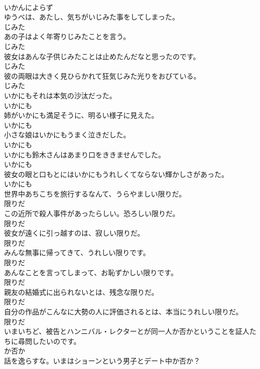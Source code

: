 \documentclass[8pt]{extreport}
\begin{document}
\begin{CJK}{UTF8}{min}
\\	いかんによらず
\\	ゆうべは、あたし、気ちがいじみた事をしてしまった。	
\\	じみた
\\	あの子はよく年寄りじみたことを言う。	
\\	じみた
\\	彼女はあんな子供じみたことは止めたんだなと思ったのです。	
\\	じみた
\\	彼の両眼は大きく見ひらかれて狂気じみた光りをおびている。	
\\	じみた
\\	いかにもそれは本気の沙汰だった。	
\\	いかにも
\\	姉がいかにも満足そうに、明るい様子に見えた。	
\\	いかにも
\\	小さな娘はいかにもうまく泣きだした。	
\\	いかにも
\\	いかにも鈴木さんはあまり口をききませんでした。	
\\	いかにも
\\	彼女の眼と口もとにはいかにもうれしくてならない輝かしさがあった。	
\\	いかにも
\\	世界中あちこちを旅行するなんて、うらやましい限りだ。	
\\	限りだ
\\	この近所で殺人事件があったらしい。恐ろしい限りだ。	
\\	限りだ
\\	彼女が遠くに引っ越すのは、寂しい限りだ。	
\\	限りだ
\\	みんな無事に帰ってきて、うれしい限りです。	
\\	限りだ
\\	あんなことを言ってしまって、お恥ずかしい限りです。	
\\	限りだ
\\	親友の結婚式に出られないとは、残念な限りだ。	
\\	限りだ
\\	自分の作品がこんなに大勢の人に評価されるとは、本当にうれしい限りだ。	
\\	限りだ
\\	いまいちど、被告とハンニバル・レクターとが同一人か否かということを証人たちに尋問したいのです。	
\\	か否か
\\	話を逸らすな。いまはショーンという男子とデート中か否か？	

\end{CJK}
\end{document}
